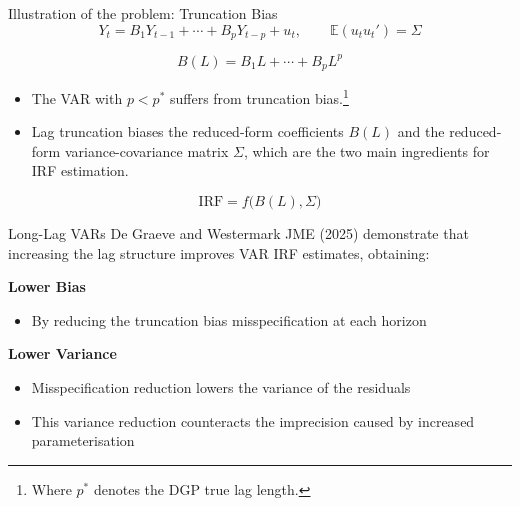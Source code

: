 \documentclass[11pt]{beamer}
\begin{document}

\begin{frame}{Illustration of the problem: Truncation Bias}\label{slide:truncation_bias}
    \begin{equation}
        Y_t = B_1Y_{t-1} + \cdots + B_pY_{t-p} + u_t, \qquad \mathbb{E}(u_t u_t') = \Sigma
    \end{equation}

    \begin{equation}
        B(L) = B_1L + \cdots + B_pL^p
    \end{equation}

    \begin{itemize}
        \item The VAR with $p < p^{*}$ suffers from truncation bias.\footnote{Where $p^{*}$ denotes the DGP true lag length.}

        \item Lag truncation biases the reduced-form coefficients $B(L)$ and the reduced-form variance-covariance matrix $\Sigma$, which are the two main ingredients for IRF estimation.
    \end{itemize}

    \begin{equation}
        \mathrm{IRF} = f\bigl(B(L),\Sigma\bigr)
    \end{equation}


\end{frame}


\begin{frame}{Long-Lag VARs}
    De Graeve and Westermark JME (2025) demonstrate that increasing the lag structure improves VAR IRF estimates, obtaining:
    \pause
    \vspace{0.4cm}
    
    \textbf{Lower Bias}
    \begin{itemize}
        \item By reducing the truncation bias misspecification at each horizon
    \end{itemize}
    \pause

    \vspace{0.4cm}
    \textbf{Lower Variance}
    \begin{itemize}
        \item Misspecification reduction lowers the variance of the residuals
        \item This variance reduction counteracts the imprecision caused by increased parameterisation
    \end{itemize}
\end{frame}
\end{document}
